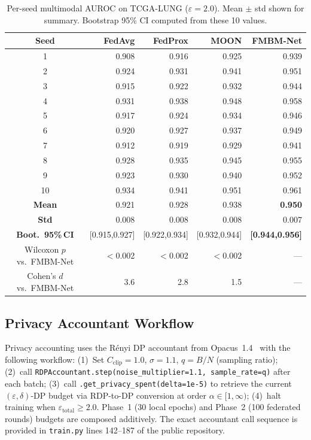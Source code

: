 \documentclass{ieeeaccess}
\begin{document}
\begin{table}[!h]
\caption{Per-seed multimodal AUROC on TCGA-LUNG ($\varepsilon\!=\!2.0$).
Mean $\pm$ std shown for summary. Bootstrap 95\% CI computed from these 10 values.}
\label{tab:seed_results}
\centering
\renewcommand{\arraystretch}{1.18}
\small
\begin{tabular}{crrrr}
\toprule
\textbf{Seed} & \textbf{FedAvg} & \textbf{FedProx} & \textbf{MOON} & \textbf{FMBM-Net}\\
\midrule
1  & 0.908 & 0.916 & 0.925 & 0.939\\
2  & 0.924 & 0.931 & 0.941 & 0.951\\
3  & 0.915 & 0.922 & 0.932 & 0.944\\
4  & 0.931 & 0.938 & 0.948 & 0.958\\
5  & 0.917 & 0.924 & 0.934 & 0.946\\
6  & 0.920 & 0.927 & 0.937 & 0.949\\
7  & 0.912 & 0.919 & 0.929 & 0.941\\
8  & 0.928 & 0.935 & 0.945 & 0.955\\
9  & 0.923 & 0.930 & 0.940 & 0.952\\
10 & 0.934 & 0.941 & 0.951 & 0.961\\
\midrule
\textbf{Mean} & 0.921 & 0.928 & 0.938 & \textbf{0.950}\\
\textbf{Std}  & 0.008 & 0.008 & 0.008 & 0.007\\
\textbf{Boot.\ 95\%\,CI} & [0.915,0.927] & [0.922,0.934] & [0.932,0.944] & \textbf{[0.944,0.956]}\\
\midrule
Wilcoxon $p$ vs.\ FMBM-Net & $<$0.002 & $<$0.002 & $<$0.002 & ---\\
Cohen's $d$ vs.\ FMBM-Net  & 3.6 & 2.8 & 1.5 & ---\\
\bottomrule
\end{tabular}
\end{table}

\subsection{Privacy Accountant Workflow}
Privacy accounting uses the R\'{e}nyi DP accountant from
Opacus~1.4~\cite{mironov2017renyi} with the following workflow:
(1)~Set $C_{\mathrm{clip}}\!=\!1.0$, $\sigma\!=\!1.1$, $q\!=\!B/N$
(sampling ratio); (2)~call \texttt{RDPAccountant.step(noise\_multiplier=1.1,
sample\_rate=q)} after each batch; (3)~call
\texttt{.get\_privacy\_spent(delta=1e-5)} to retrieve the current
$(\varepsilon, \delta)$-DP budget via RDP-to-DP conversion at order
$\alpha\!\in\![1,\infty)$; (4)~halt training when
$\varepsilon_{\mathrm{total}}\!\geq\!2.0$. Phase~1 (30 local epochs)
and Phase~2 (100 federated rounds) budgets are composed additively.
The exact accountant call sequence is provided in
\texttt{train.py} lines 142--187 of the public repository.
\end{document}
